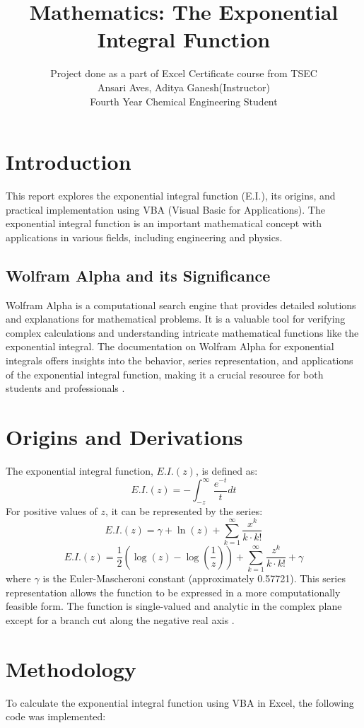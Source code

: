 \documentclass{article}
\title{Mathematics: The Exponential Integral Function}
\author{Project done as a part of Excel Certificate course from TSEC\\ Ansari Aves, Aditya Ganesh(Instructor)\\ Fourth Year Chemical Engineering Student\\}
\begin{document}
\maketitle

\section{Introduction}
This report explores the exponential integral function (E.I.), its origins, and practical implementation using VBA (Visual Basic for Applications). The exponential integral function is an important mathematical concept with applications in various fields, including engineering and physics.

\subsection{Wolfram Alpha and its Significance}
Wolfram Alpha is a computational search engine that provides detailed solutions and explanations for mathematical problems. It is a valuable tool for verifying complex calculations and understanding intricate mathematical functions like the exponential integral. The documentation on Wolfram Alpha for exponential integrals offers insights into the behavior, series representation, and applications of the exponential integral function, making it a crucial resource for both students and professionals \cite{wolfram_alpha}.

\section{Origins and Derivations}
The exponential integral function, \( E.I.(z) \), is defined as:
\[
E.I.(z) = -\int_{-z}^{\infty} \frac{e^{-t}}{t} dt
\]
For positive values of \( z \), it can be represented by the series:
\[
E.I.(z) = \gamma + \ln(z) + \sum_{k=1}^{\infty} \frac{x^k}{k \cdot k!}
\]
\[
E.I.(z) = \frac{1}{2} \left( \log(z) - \log\left(\frac{1}{z}\right) \right) + \sum_{k=1}^{\infty} \frac{z^k}{k \cdot k!} + \gamma
\]
where \( \gamma \) is the Euler-Mascheroni constant (approximately 0.57721). This series representation allows the function to be expressed in a more computationally feasible form. The function is single-valued and analytic in the complex plane except for a branch cut along the negative real axis \cite{mathworld,encyclopedia_math}.

\section{Methodology}
To calculate the exponential integral function using VBA in Excel, the following code was implemented:
\end{document}
